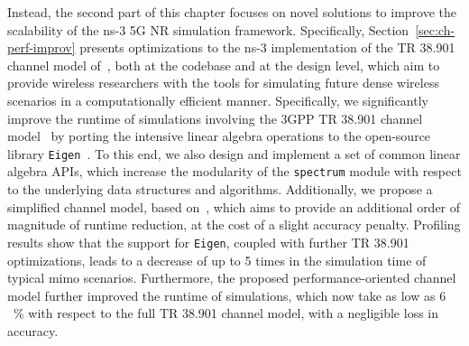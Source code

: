 Instead, the second part of this chapter focuses on novel solutions to improve the scalability of the ns-3 5G NR simulation framework. Specifically, Section~\ref{sec:ch-perf-improv} presents optimizations to the ns-3 implementation of the TR 38.901 channel model of~\cite{tommaso:20}, both at the codebase and at the design level, which aim to provide wireless researchers with the tools for simulating future dense wireless scenarios in a computationally efficient manner. Specifically, we significantly improve the runtime of simulations involving the 3GPP TR 38.901 channel model~\cite{TR38901} by porting the intensive linear algebra operations to the open-source library \texttt{Eigen}~\cite{eigenweb}. To this end, we also design and implement a set of common linear algebra APIs, which increase the modularity of the \texttt{spectrum} module with respect to the underlying data structures and algorithms.
Additionally, we propose a simplified channel model, based on~\cite{TR38901}, which aims to provide an additional order of magnitude of runtime reduction, at the cost of a slight accuracy penalty. Profiling results show that the support for \texttt{Eigen}, coupled with further TR 38.901 optimizations, leads to a decrease of up to 5 times in the simulation time of typical \gls{mimo} scenarios. Furthermore, the proposed performance-oriented channel model further improved the runtime of simulations, which now take as low as $6$~\% with respect to the full TR 38.901 channel model, with a negligible loss in accuracy.




